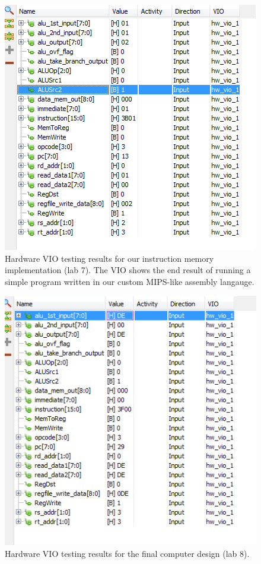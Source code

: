 \documentclass[12pt, letterpaper]{article}
\begin{document}
\begin{figure}[h]
\centering
\includegraphics[width=0.8\linewidth]{images/lab7-hardware-test.png}
\caption{Hardware VIO testing results for our instruction memory implementation (lab 7).  The VIO shows the end result of running a simple program written in our custom MIPS-like assembly langauge.}
\end{figure}

\begin{figure}[h]
\centering
\includegraphics[width=0.8\linewidth]{images/lab8-hardware-test-1.png}
\caption{Hardware VIO testing results for the final computer design (lab 8).}
\end{figure}
\end{document}
